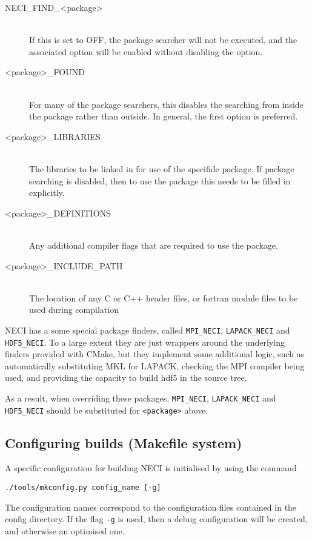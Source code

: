 \documentclass[a4paper,notitlepage,dvipsnames]{scrreprt}
\newcommand\codeitem[1]{\needspace{1.5\baselineskip}\item[\textnormal{\ttfamily #1 \nopagebreak}] \hfill \\ \nopagebreak}
\let\code\lstinline
\begin{document}
    \begin{description}
        \codeitem{NECI\_FIND\_<package>}
            If this is set to OFF, the package searcher will not be executed, and the associated
            option will be enabled without disabling the option.
        \codeitem{<package>\_FOUND}
            For many of the package searchers, this disables the searching from inside the package
            rather than outside. In general, the first option is preferred.
        \codeitem{<package>\_LIBRARIES}
            The libraries to be linked in for use of the specifide package. If package searching is
            disabled, then to use the package this needs to be filled in explicitly.
        \codeitem{<package>\_DEFINITIONS}
            Any additional compiler flags that are required to use the package.
        \codeitem{<package>\_INCLUDE\_PATH}
            The location of any C or C++ header files, or fortran module files to be used during
            compilation
    \end{description}

    NECI has a some special package finders, called \code{MPI_NECI}, \code{LAPACK_NECI} and
    \code{HDF5_NECI}. To a large
    extent they are just wrappers around the underlying finders provided with CMake, but they
    implement some additional logic, such as automatically substituting MKL for LAPACK, checking
    the MPI compiler being used, and providing the capacity to build hdf5 in the source tree.

    As a result, when overriding these packages, \code{MPI_NECI}, \code{LAPACK_NECI} and
    \code{HDF5_NECI} should be substituted for \code{<package>} above.

\subsection{Configuring builds (Makefile system)}
	A specific configuration for building NECI is initialised by using the
	command
	\begin{lstlisting}[gobble=4]
		./tools/mkconfig.py config_name [-g]
	\end{lstlisting}
	The configuration names correspond to the configuration files contained in
	the config directory. If the flag \code{-g} is used, then a debug
	configuration will be created, and otherwise an optimised one.
\end{document}
